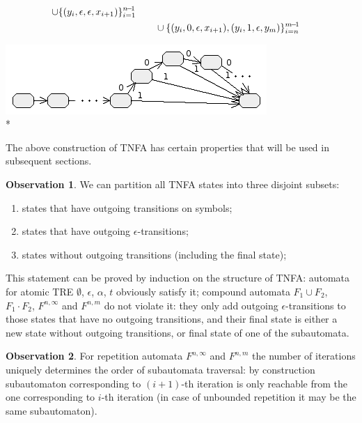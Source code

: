 \documentclass{article}
\newenvironment{Xfig}
    {\par\medskip\noindent\minipage{\linewidth}\begin{center}}
    {\end{center}\endminipage\par\medskip}
\theoremstyle{definition}
\newtheorem{Xobs}{Observation}
\begin{document}
\begin{multicols}{2}
\begin{align*}
                \cup \{(y_i, \epsilon, \epsilon, x_{i+1})\}_{i=1}^{n\!-\!1} \\
                & \hphantom{\hspace{2em}}
                    \cup \{(y_i, 0, \epsilon, x_{i+1}), (y_i, 1, \epsilon, y_m)\}_{i=n}^{m\!-\!1}
    \end{align*}
%
\begin{Xfig}
\includegraphics[width=0.9\linewidth]{img/tnfa/repeat_bound.png}\\*
\end{Xfig}

The above construction of TNFA has certain properties that will be used in subsequent sections.

\begin{Xobs}\label{obs_tnfa_states}
We can partition all TNFA states into three disjoint subsets:
\begin{enumerate}
    \item states that have outgoing transitions on symbols;
    \item states that have outgoing $\epsilon$-transitions;
    \item states without outgoing transitions (including the final state);
\end{enumerate}
This statement can be proved by induction on the structure of TNFA:
automata for atomic TRE $\emptyset$, $\epsilon$, $\alpha$, $t$ obviously satisfy it;
compound automata $F_1 \cup F_2$, $F_1 \cdot F_2$, $F^{n,\infty}$ and $F^{n,m}$
do not violate it:
they only add outgoing $\epsilon$-transitions to those states that have no outgoing transitions,
and their final state is either a new state without outgoing transitions,
or final state of one of the subautomata.
\end{Xobs}

\begin{Xobs}\label{obs_tnfa_repeat}
For repetition automata $F^{n,\infty}$ and $F^{n,m}$
the number of iterations uniquely determines the order of subautomata traversal:
by construction subautomaton corresponding to $(i \!+\! 1)$-th iteration is only reachable
from the one corresponding to $i$-th iteration
(in case of unbounded repetition it may be the same subautomaton).
\end{Xobs}


\end{multicols}
\end{document}
